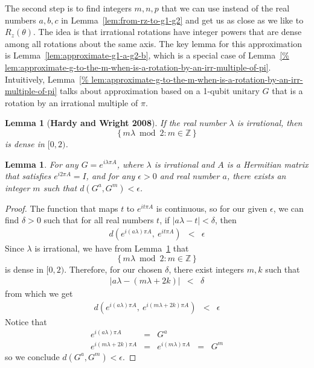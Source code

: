 \documentclass[11pt]{article}
\def\({\begin{eqnarray*}}
\def\){\end{eqnarray*}}
\newtheorem{lemma}[theorem]{Lemma}
\begin{document}
The second step is to find integers $m,n,p$ that we can use 
instead of the real numbers $a,b,c$ in
Lemma~\ref{lem:from-rz-to-g1-g2} and 
get us as close as we like to $R_z(\theta)$.
The idea is that irrational rotations have integer powers that 
are dense among all rotations about the same axis.
The key lemma for this approximation is
Lemma~\ref{lem:approximate-g1-a-g2-b}, which is a special case of 
Lemma~\ref{%
lem:approximate-g-to-the-m-when-is-a-rotation-by-an-irr-multiple-of-pi}.
Intuitively, 
Lemma~\ref{%
lem:approximate-g-to-the-m-when-is-a-rotation-by-an-irr-multiple-of-pi}
talks about approximation based on a 1-qubit unitary $G$ that is a rotation by 
an irrational multiple of $\pi$.

\begin{lemma}[{\bf Hardy and Wright 2008}]
If the real number $\lambda$ is irrational, then 
\[
\{\,m\lambda \bmod 2 : m\in\mathbb Z\,\}
\]
is dense in $[0,2)$.
\label{lem:for-irrational-lambda-we-have-m-lambda-is-dense-mod-2}
\end{lemma}

\begin{lemma}
\label{lem:approximate-g-to-the-m-when-is-a-rotation-by-an-irr-multiple-of-pi}
For any $G = e^{i\lambda \pi A}$, where $\lambda$ is irrational and
$A$ is a Hermitian matrix that satisfies $e^{i 2 \pi A} = I$, 
and for any $\epsilon > 0$ and real number $a$, 
there exists an integer $m$ such that 
$d(G^a, G^m) < \epsilon$.
\end{lemma}

\begin{proof}
% 
The function that maps $t$ to $e^{i t \pi A}$ is continuous,
so for our given $\epsilon$, we can find $\delta > 0$ such that
for all real numbers $t$, if $|a\lambda - t| < \delta$, then 
\(
d(e^{i (a \lambda) \pi A},\ e^{i t \pi A}) 
&<&
\epsilon
\)
Since $\lambda$ is irrational, we have from
Lemma~\ref{lem:for-irrational-lambda-we-have-m-lambda-is-dense-mod-2} 
that 
\[
\{\,m\lambda \bmod 2 : m\in\mathbb Z\,\}
\]
is dense in $[0,2)$.
Therefore, for our chosen $\delta$, there exist integers $m, k$ such that
\(
|a\lambda - (m \lambda + 2k)| &<& \delta
\)
from which we get
\(
d(e^{i (a \lambda) \pi A},\ e^{i (m \lambda + 2k) \pi A})
&<&
\epsilon
\)
Notice that
\(
e^{i (a \lambda) \pi A} 
&=&
G^a
\\
e^{i (m \lambda + 2k) \pi A}
&=&
e^{i (m \lambda) \pi A}
\;\;=\;\;
G^m
\)
so we conclude 
$d(G^a, G^m) < \epsilon$.
\end{proof}
\end{document}
